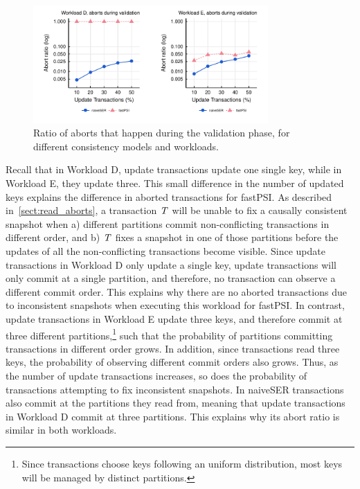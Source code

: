 \begin{figure}[t]
\begin{center}
\includegraphics[width=0.8\textwidth]{figures/abort_rate_bench_2pc.pdf}
\vspace{-0.75cm}
\end{center}
\caption{Ratio of aborts that happen during the validation phase, for different consistency models and workloads.}
\label{fig:raw_abort_rate_2pc}
\end{figure}

Recall that in Workload D, update transactions update one single key, while in Workload E, they update three. This small difference in the number of updated keys explains the difference in aborted transactions for fastPSI. As described in~\ref{sect:read_aborts}, a transaction $\mathit{T}$ will be unable to fix a causally consistent snapshot when a) different partitions commit non-conflicting transactions in different order, and b) $\mathit{T}$ fixes a snapshot in one of those partitions before the updates of all the non-conflicting transactions become visible. Since update transactions in Workload D only update a single key, update transactions will only commit at a single partition, and therefore, no transaction can observe a different commit order. This explains why there are no aborted transactions due to inconsistent snapshots when executing this workload for fastPSI. In contrast, update transactions in Workload E update three keys, and therefore commit at three different partitions,\footnote{Since transactions choose keys following an uniform distribution, most keys will be managed by distinct partitions.} such that the probability of partitions committing transactions in different order grows. In addition, since transactions read three keys, the probability of observing different commit orders also grows. Thus, as the number of update transactions increases, so does the probability of transactions attempting to fix inconsistent snapshots. In naiveSER transactions also commit at the partitions they read from, meaning that update transactions in Workload D commit at three partitions. This explains why its abort ratio is similar in both workloads.

